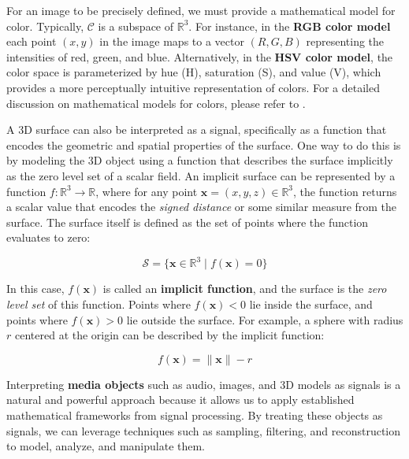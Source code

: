 For an image to be precisely defined, we must provide a mathematical model for color. Typically, $\mathcal{C}$ is a subspace of $\mathbb{R}^3$. For instance, in the \textbf{RGB color model} each point \( (x, y) \) in the image maps to a vector \( (R, G, B) \) representing the intensities of red, green, and blue. Alternatively, in the \textbf{HSV color model}, the color space is parameterized by hue (H), saturation (S), and value (V), which provides a more perceptually intuitive representation of colors. For a detailed discussion on mathematical models for colors, please refer to \cite{ipcgVelho2014}.

A 3D surface can also be interpreted as a signal, specifically as a function that encodes the geometric and spatial properties of the surface. One way to do this is by modeling the 3D object using a function that describes the surface implicitly as the zero level set of a scalar field. An implicit surface can be represented by a function \( f : \mathbb{R}^3 \rightarrow \mathbb{R} \), where for any point \( \mathbf{x} = (x, y, z) \in \mathbb{R}^3 \), the function returns a scalar value that encodes the \textit{signed distance} or some similar measure from the surface. The surface itself is defined as the set of points where the function evaluates to zero:

\[
\mathcal{S} = \{ \mathbf{x} \in \mathbb{R}^3 \mid f(\mathbf{x}) = 0 \}
\]

In this case, \( f(\mathbf{x}) \) is called an \textbf{implicit function}, and the surface is the \textit{zero level set} of this function. Points where \( f(\mathbf{x}) < 0 \) lie inside the surface, and points where \( f(\mathbf{x}) > 0 \) lie outside the surface. For example, a sphere with radius \( r \) centered at the origin can be described by the implicit function:

\[
f(\mathbf{x}) = \|\mathbf{x}\| - r
\]

Interpreting \textbf{media objects} such as audio, images, and 3D models as signals is a natural and powerful approach because it allows us to apply established mathematical frameworks from signal processing. By treating these objects as signals, we can leverage techniques such as sampling, filtering, and reconstruction to model, analyze, and manipulate them.



